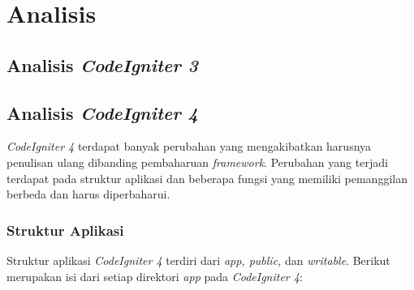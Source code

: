 \chapter{Analisis}
\label{chap:analisis}

\section{Analisis \textit{CodeIgniter 3}}
\label{sec:analisis-ci3}
\section{Analisis \textit{CodeIgniter 4}}
\label{sec:analisis-ci4}
\textit{CodeIgniter 4} terdapat banyak perubahan yang mengakibatkan harusnya penulisan ulang dibanding pembaharuan \textit{framework}. Perubahan yang terjadi terdapat pada struktur aplikasi dan beberapa fungsi yang memiliki pemanggilan berbeda dan harus diperbaharui.
\subsection{Struktur Aplikasi}
Struktur aplikasi \textit{CodeIgniter 4} terdiri dari \textit{app, public,} dan \textit{writable}. Berikut merupakan isi dari setiap direktori \textit{app} pada \textit{CodeIgniter 4}:
